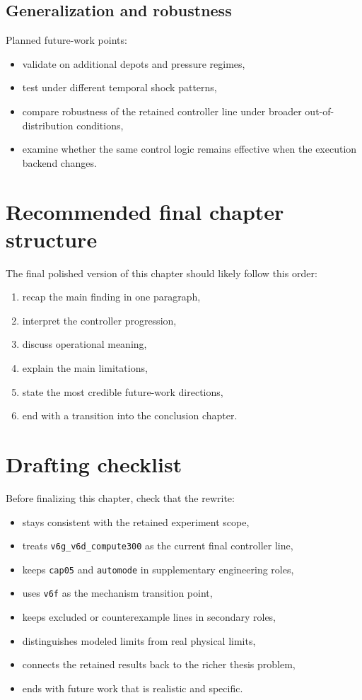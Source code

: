 \subsection{Generalization and robustness}

Planned future-work points:
\begin{itemize}
    \item validate on additional depots and pressure regimes,
    \item test under different temporal shock patterns,
    \item compare robustness of the retained controller line under broader out-of-distribution conditions,
    \item examine whether the same control logic remains effective when the execution backend changes.
\end{itemize}

\section{Recommended final chapter structure}

The final polished version of this chapter should likely follow this order:
\begin{enumerate}
    \item recap the main finding in one paragraph,
    \item interpret the controller progression,
    \item discuss operational meaning,
    \item explain the main limitations,
    \item state the most credible future-work directions,
    \item end with a transition into the conclusion chapter.
\end{enumerate}

\section{Drafting checklist}

Before finalizing this chapter, check that the rewrite:
\begin{itemize}
    \item stays consistent with the retained experiment scope,
    \item treats \texttt{v6g\_v6d\_compute300} as the current final controller line,
    \item keeps \texttt{cap05} and \texttt{automode} in supplementary engineering roles,
    \item uses \texttt{v6f} as the mechanism transition point,
    \item keeps excluded or counterexample lines in secondary roles,
    \item distinguishes modeled limits from real physical limits,
    \item connects the retained results back to the richer thesis problem,
    \item ends with future work that is realistic and specific.
\end{itemize}
